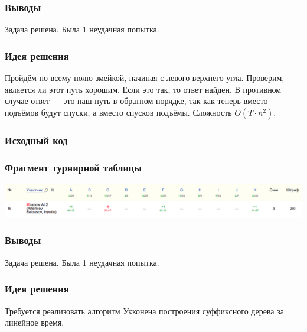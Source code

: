 \subsubsection*{Выводы}
Задача решена. Была 1 неудачная попытка.
\pagebreak


\subsubsection*{Идея решения}
Пройдём по всему полю змейкой, начиная с левого верхнего угла. Проверим, является ли этот путь хорошим. Если это так, то ответ найден. В противном случае ответ --- это наш путь в обратном порядке, так как теперь вместо подъёмов будут спуски, а вместо спусков подъёмы. Сложность $O(T \cdot n ^ 2)$.
\subsubsection*{Исходный код}

\subsubsection*{Фрагмент турнирной таблицы}
\includegraphics[width=\textwidth]{images/220420.png}\newline\noindent
\subsubsection*{Выводы}
Задача решена. Была 1 неудачная попытка.
\pagebreak


\subsubsection*{Идея решения}
Требуется реализовать алгоритм Укконена построения суффиксного дерева за линейное время.

